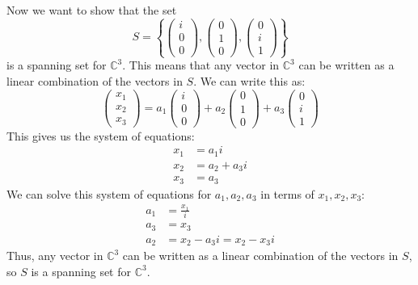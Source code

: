\documentclass{article}
\begin{document}
Now we want to show that the set
\[
   S = \left\{
      \begin{pmatrix}
         i \\
         0 \\
         0
      \end{pmatrix},
      \begin{pmatrix}
         0 \\
         1 \\
         0
      \end{pmatrix},
      \begin{pmatrix}
         0 \\
         i \\
         1
      \end{pmatrix}
   \right\}
\]
is a spanning set for \(\mathbb{C}^3\). This means that any vector in \(\mathbb{C}^3\) can be written as a linear combination of the vectors in \(S\). We can write this as:
\[
   \begin{pmatrix}
      x_1 \\
      x_2 \\
      x_3
   \end{pmatrix} = a_1 \begin{pmatrix}
      i \\
      0 \\
      0
   \end{pmatrix} + a_2 \begin{pmatrix}
      0 \\
      1 \\
      0
   \end{pmatrix} + a_3 \begin{pmatrix}
      0 \\
      i \\
      1
   \end{pmatrix}
\]
This gives us the system of equations:
\begin{align*}
   x_1 &= a_1 i \\
   x_2 &= a_2 + a_3 i \\
   x_3 &= a_3
\end{align*}
We can solve this system of equations for \(a_1, a_2, a_3\) in terms of \(x_1, x_2, x_3\):
\begin{align*}
   a_1 &= \frac{x_1}{i} \\
   a_3 &= x_3 \\
   a_2 &= x_2 - a_3 i = x_2 - x_3 i
\end{align*}
Thus, any vector in \(\mathbb{C}^3\) can be written as a linear combination of the vectors in \(S\), so \(S\) is a spanning set for \(\mathbb{C}^3\).
\end{document}
